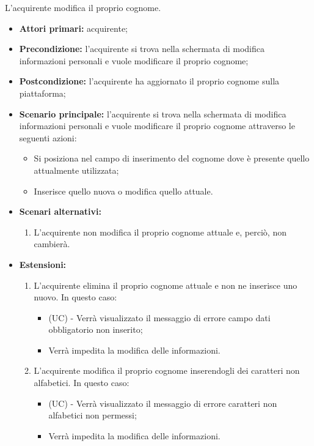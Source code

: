 L'acquirente modifica il proprio cognome.
\begin{itemize}
    \item \textbf{Attori primari:} acquirente;
    \item \textbf{Precondizione:} l'acquirente si trova nella schermata di modifica informazioni personali e vuole modificare il proprio cognome;
    \item \textbf{Postcondizione:} l'acquirente ha aggiornato il proprio cognome sulla piattaforma;
    \item \textbf{Scenario principale:} l'acquirente si trova nella schermata di modifica informazioni personali e vuole modificare il proprio cognome attraverso le seguenti azioni:
        \begin{itemize}
            \item Si posiziona nel campo di inserimento del cognome dove è presente quello attualmente utilizzata;
            \item Inserisce quello nuova o modifica quello attuale.
        \end{itemize}
    \item \textbf{Scenari alternativi:} 
    \begin{enumerate}[label=\lett]
        \item L'acquirente non modifica il proprio cognome attuale e, perciò, non cambierà.
    \end{enumerate}
    \item \textbf{Estensioni:} 
    \begin{enumerate}[label=\lett]
        \item L'acquirente elimina il proprio cognome attuale e non ne inserisce uno nuovo. In questo caso:
        \begin{itemize}
            \item (UC) - Verrà visualizzato il messaggio di errore campo dati obbligatorio non inserito;
            \item Verrà impedita la modifica delle informazioni.
        \end{itemize}
        \item L'acquirente modifica il proprio cognome inserendogli dei caratteri non alfabetici. In questo caso:
        \begin{itemize}
            \item (UC) - Verrà visualizzato il messaggio di errore caratteri non alfabetici non permessi;
            \item Verrà impedita la modifica delle informazioni.
        \end{itemize}
    \end{enumerate}
\end{itemize}

